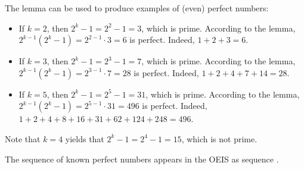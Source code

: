 \documentclass[12pt]{article}
\begin{document}
The lemma can be used to produce examples of (even) perfect numbers:

\begin{itemize}
\item If $k=2$, then $2^k-1=2^2-1=3$, which is prime.  According to the lemma, $2^{k-1}(2^k-1)=2^{2-1} \cdot 3=6$ is perfect.  Indeed, $1+2+3=6$.
\item If $k=3$, then $2^k-1=2^3-1=7$, which is prime.  According to the lemma, $2^{k-1}(2^k-1)=2^{3-1} \cdot 7=28$ is perfect.  Indeed, $1+2+4+7+14=28$.
\item If $k=5$, then $2^k-1=2^5-1=31$, which is prime.  According to the lemma, $2^{k-1}(2^k-1)=2^{5-1} \cdot 31=496$ is perfect.  Indeed, $1+2+4+8+16+31+62+124+248=496$.
\end{itemize}

Note that $k=4$ yields that $2^k-1=2^4-1=15$, which is not prime.

The sequence of known perfect numbers appears in the OEIS as sequence .
\end{document}
